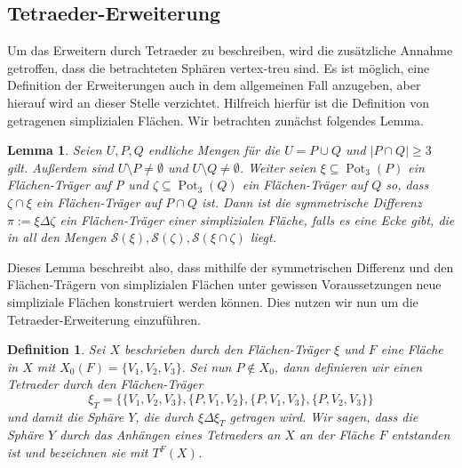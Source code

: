 \documentclass[12pt,titlepage,twoside,cleardoublepage]{article}
\theoremstyle{nummermitklammern}
\newtheorem{lemma}[temp]{Lemma}
\newtheorem{definition}[temp]{Definition}
\newtheorem{definition}[zahl]{Definition}
\newtheorem{lemma}[zahl]{Lemma}
\numberwithin{equation}{section}
\DeclareMathOperator{\Pot}{Pot}
\begin{document}
  \subsection{Tetraeder-Erweiterung}
 Um das Erweitern durch Tetraeder zu beschreiben, wird die zusätzliche Annahme getroffen, dass die betrachteten Sphären vertex-treu sind. Es ist möglich, eine Definition der Erweiterungen auch in dem allgemeinen Fall anzugeben, aber hierauf wird an dieser Stelle verzichtet.
 Hilfreich hierfür ist die Definition von getragenen simplizialen Flächen. Wir betrachten zunächst folgendes Lemma.
\begin{lemma}
Seien $U,P,Q$ endliche Mengen für die $U=P\cup Q$ und $\vert P\cap Q \vert \geq 3$ gilt. Außerdem sind $U\setminus P\neq \emptyset$ und $U\setminus Q \neq \emptyset$. Weiter seien $\xi \subseteq \Pot_3(P)$ ein Flächen-Träger auf P und $\zeta \subseteq \Pot_3(Q)$ ein Flächen-Träger auf $Q$ so, dass $\zeta \cap \xi$ ein Flächen-Träger auf $P \cap Q$ ist. Dann ist die symmetrische Differenz $\pi :=\xi \Delta \zeta$ ein Flächen-Träger einer simplizialen Fläche, falls es eine Ecke gibt, die in all den Mengen $\mathcal{S}(\xi),\mathcal{S}(\zeta),\mathcal{S}(\xi\cap\zeta)$ liegt. 
\end{lemma}
Dieses Lemma beschreibt also, dass mithilfe der symmetrischen Differenz und den Flächen-Trägern von simplizialen Flächen unter gewissen Voraussetzungen neue simpliziale Flächen konstruiert werden können. Dies nutzen wir nun um die Tetraeder-Erweiterung einzuführen.
\begin{definition}
Sei $X$ beschrieben durch den Flächen-Träger $\xi$ und $F$ eine Fläche in $X$ mit $X_0(F)=\{V_1,V_2,V_3\}.$ Sei nun $P\notin X_0$, dann definieren wir einen Tetraeder durch den Flächen-Träger
\[
\xi_T=\{\{V_1,V_2,V_3\},\{P,V_1,V_2\},\{P,V_1,V_3\},\{P,V_2,V_3\}\}
\] 
und damit die Sphäre $Y$, die durch $\xi \Delta \xi_T$ getragen wird. Wir sagen, dass die Sphäre $Y$ durch das Anhängen eines Tetraeders an $X$ an der Fläche $F$ entstanden ist und bezeichnen sie mit $T^F(X)$.
\end{definition}
\end{document}
